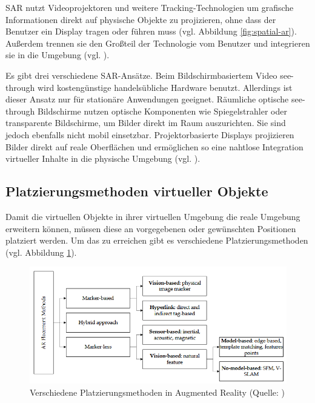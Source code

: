 \ac{SAR} nutzt Videoprojektoren und weitere Tracking-Technologien um grafische Informationen direkt auf physische Objekte zu projizieren, ohne dass der Benutzer ein Display tragen oder führen muss (vgl. Abbildung \ref{fig:spatial-ar}). Außerdem trennen sie den Großteil der Technologie vom Benutzer und integrieren sie in die Umgebung (vgl. \citealp[S. 348]{carmigniani_augmented_2011}).

Es gibt drei verschiedene \ac{SAR}-Ansätze. Beim Bildschirmbasiertem Video see-through wird kostengünstige handelsübliche Hardware benutzt. Allerdings ist dieser Ansatz nur für stationäre Anwendungen geeignet. Räumliche optische see-through Bildschirme nutzen optische Komponenten wie Spiegelstrahler oder transparente Bildschirme, um Bilder direkt im Raum auszurichten. Sie sind jedoch ebenfalls nicht mobil einsetzbar. Projektorbasierte Displays projizieren Bilder direkt auf reale Oberflächen und ermöglichen so eine nahtlose Integration virtueller Inhalte in die physische Umgebung (vgl. \citealp[S. 348]{carmigniani_augmented_2011}).

\subsection{Platzierungsmethoden virtueller Objekte}
Damit die virtuellen Objekte in ihrer virtuellen Umgebung die reale Umgebung erweitern können, müssen diese an vorgegebenen oder gewünschten Positionen platziert werden. Um das zu erreichen gibt es verschiedene Platzierungsmethoden (vgl. Abbildung \ref{fig:placement-ar}).

\begin{figure}[ht]
\centering
\includegraphics[width=1\linewidth]{content/pictures/placement-methods.PNG}
\caption{Verschiedene Platzierungsmethoden in Augmented Reality (Quelle: \citealp[S. 3]{el_barhoumi_assessment_2022})}
\label{fig:placement-ar}
\end{figure}

